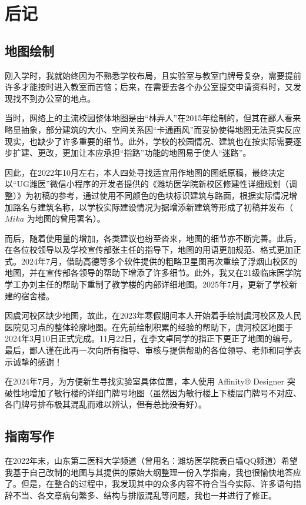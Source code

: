 \chapter[后记]{后记}
\section[地图绘制]{地图绘制}
刚入学时，我就始终因为不熟悉学校布局，且实验室与教室门牌号复杂，需要提前许多才能按时进入教室而苦恼；后来，在需要去各个办公室提交申请资料时，又发现找不到办公室的地点。

当时，网络上的主流校园整体地图是由“林弄人”在2015年绘制的，但其在鄙人看来略显抽象，部分建筑的大小、空间关系因“卡通画风”而妥协使得地图无法真实反应现实，也缺少了许多重要的细节。此外，学校的校园情况、建筑也在按实际需要逐步扩建、更改，更加让本应承担“指路”功能的地图易于使人“迷路”。

因此，在2022年10月左右，本人四处寻找适宜用作地图的图纸原稿，最终决定以“UG潍医”微信小程序的开发者提供的《潍坊医学院新校区修建性详细规划（调整）》为初稿的参考，通过使用不同颜色的色块标识建筑与路面，根据实际情况增加路名与建筑名称，以学校实际建设情况为据增添新建筑等形成了初稿并发布（$Mika$ 为地图的曾用署名）。

而后，随着使用量的增加，各类建议也纷至沓来，地图的细节亦不断完善。此后，在各位校领导以及学校宣传部张主任的指导下，地图的用语更加规范、格式更加正式。2024年7月，借助高德等多个软件提供的粗略卫星图再次重绘了浮烟山校区的地图，并在宣传部各领导的帮助下增添了许多细节。此外，我又在21级临床医学院学工办刘主任的帮助下重制了教学楼的内部详细地图。2025年7月，更新了学校新建的宿舍楼。

因虞河校区缺少地图，故此，在2023年寒假期间本人开始着手绘制虞河校区及人民医院见习点的整体轮廓地图。在先前绘制积累的经验的帮助下，虞河校区地图于2024年3月10日正式完成。11月22日，在李文卓同学的指正下更正了地图的编号。最后，鄙人谨在此再一次向所有指导、审核与提供帮助的各位领导、老师和同学表示诚挚的感谢！

在2024年7月，为方便新生寻找实验室具体位置，本人使用 Affinity® Designer 突破性地增加了敏行楼的详细门牌号地图（虽然因为敏行楼上下楼层门牌号不对应、各门牌号排布极其混乱而难以辨认，\st{但有总比没有好}）。

\section[指南写作]{指南写作}

在2022年末，山东第二医科大学频道（曾用名：潍坊医学院表白墙QQ频道）希望我基于自己改制的地图与其提供的原始大纲整理一份入学指南，我也很愉快地答应了。但是，在整合的过程中，我发现其中的众多内容不符合当今实际、许多语句措辞不当、各文章病句繁多、结构与排版混乱等问题，我也一并进行了修正。

